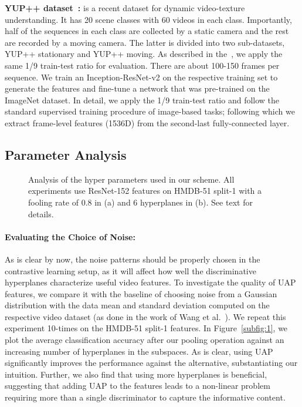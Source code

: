 \documentclass[runningheads]{llncs}
\newcommand{\para}[1]{\noindent\paragraph*{\textbf{#1}}}
\begin{document}
\noindent\textbf{YUP++ dataset~\cite{feichtenhofer2017temporal}:} is a recent dataset for dynamic video-texture understanding. It has 20 scene classes with 60 videos in each class. Importantly, half of the sequences in each class are collected by a static camera and the rest are recorded by a moving camera. The latter is divided into two sub-datasets, YUP++ stationary and YUP++ moving. As described in the~\cite{feichtenhofer2017temporal}, we apply the same 1/9 train-test ratio for evaluation. There are about 100-150 frames per sequence. We train an Inception-ResNet-v2 on the respective training set to generate the features and fine-tune a network that was pre-trained on the ImageNet dataset. In detail, we apply the 1/9 train-test ratio and follow the standard supervised training procedure of image-based tasks; following which we extract frame-level features (1536D) from the second-last fully-connected layer. 











\subsection{Parameter Analysis}
\begin{figure}[t]
	\begin{center}
        \qquad
	\end{center}
	\caption{Analysis of the hyper parameters used in our scheme. All experiments use ResNet-152 features on HMDB-51 split-1 with a fooling rate of 0.8 in (a) and 6 hyperplanes in (b). See text for details.}
\end{figure}
\para{Evaluating the Choice of Noise:} As is clear by now, the noise patterns should be properly chosen in the contrastive learning setup, as it will affect how well the discriminative hyperplanes characterize useful video features. To investigate the quality of UAP features, we compare it with the baseline of choosing noise from a Gaussian distribution with the data mean and standard deviation computed on the respective video dataset (as done in the work of Wang et al.~\cite{wang2018video}). We repeat this experiment 10-times on the HMDB-51 split-1 features. In Figure~\ref{subfig:1}, we plot the average classification accuracy after our pooling operation against an increasing number of hyperplanes in the subspaces. As is clear, using UAP significantly improves the performance against the alternative, substantiating our intuition. Further, we also find that using more hyperplanes is beneficial, suggesting that adding UAP to the features leads to a non-linear problem requiring more than a single discriminator to capture the informative content.
\end{document}
